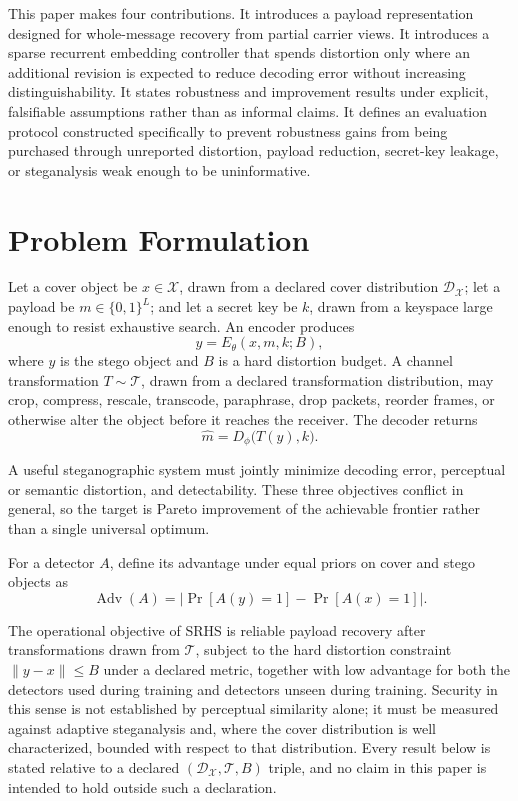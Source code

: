 \documentclass[11pt]{article}
\begin{document}
This paper makes four contributions. It introduces a payload representation designed for whole-message recovery from partial carrier views. It introduces a sparse recurrent embedding controller that spends distortion only where an additional revision is expected to reduce decoding error without increasing distinguishability. It states robustness and improvement results under explicit, falsifiable assumptions rather than as informal claims. It defines an evaluation protocol constructed specifically to prevent robustness gains from being purchased through unreported distortion, payload reduction, secret-key leakage, or steganalysis weak enough to be uninformative.

\section{Problem Formulation}

Let a cover object be $x \in \mathcal{X}$, drawn from a declared cover distribution $\mathcal{D}_\mathcal{X}$; let a payload be $m \in \{0,1\}^L$; and let a secret key be $k$, drawn from a keyspace large enough to resist exhaustive search. An encoder produces
\[
y = E_\theta(x,m,k;B),
\]
where $y$ is the stego object and $B$ is a hard distortion budget. A channel transformation $T \sim \mathcal{T}$, drawn from a declared transformation distribution, may crop, compress, rescale, transcode, paraphrase, drop packets, reorder frames, or otherwise alter the object before it reaches the receiver. The decoder returns
\[
\hat m = D_\phi\bigl(T(y),k\bigr).
\]

A useful steganographic system must jointly minimize decoding error, perceptual or semantic distortion, and detectability. These three objectives conflict in general, so the target is Pareto improvement of the achievable frontier rather than a single universal optimum.

For a detector $A$, define its advantage under equal priors on cover and stego objects as
\[
\operatorname{Adv}(A) = \bigl|\Pr[A(y)=1] - \Pr[A(x)=1]\bigr|.
\]

The operational objective of SRHS is reliable payload recovery after transformations drawn from $\mathcal{T}$, subject to the hard distortion constraint $\|y-x\| \le B$ under a declared metric, together with low advantage for both the detectors used during training and detectors unseen during training. Security in this sense is not established by perceptual similarity alone; it must be measured against adaptive steganalysis and, where the cover distribution is well characterized, bounded with respect to that distribution. Every result below is stated relative to a declared $(\mathcal{D}_\mathcal{X}, \mathcal{T}, B)$ triple, and no claim in this paper is intended to hold outside such a declaration.
\end{document}
